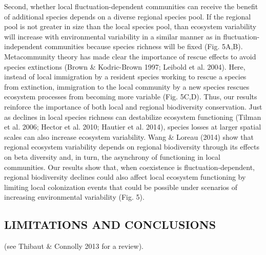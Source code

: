 \documentclass[12pt,]{article}
\begin{document}
Second, whether local fluctuation-dependent communities can receive the
benefit of additional species depends on a diverse regional species
pool. If the regional pool is not greater in size than the local species
pool, than ecosystem variability will increase with environmental
variability in a similar manner as in fluctuation-independent
communities because species richness will be fixed (Fig. 5A,B).
Metacommunity theory has made clear the importance of rescue effects to
avoid species extinctions (Brown \& Kodric-Brown 1997; Leibold et al.
2004). Here, instead of local immigration by a resident species working
to rescue a species from extinction, immigration to the local community
by a new species rescues ecosystem processes from becoming more variable
(Fig. 5C,D). Thus, our results reinforce the importance of both local
and regional biodiversity conservation. Just as declines in local
species richness can destabilize ecosystem functioning (Tilman et al.
2006; Hector et al. 2010; Hautier et al. 2014), species losses at larger
spatial scales can also increase ecosystem variability. Wang \& Loreau
(2014) show that regional ecosystem variability depends on regional
biodiversity through its effects on beta diversity and, in turn, the
asynchrony of functioning in local communities. Our results show that,
when coexistence is fluctuation-dependent, regional biodiversity
declines could also affect local ecosystem functioning by limiting local
colonization events that could be possible under scenarios of increasing
environmental variability (Fig. 5).

\subsection{LIMITATIONS AND
CONCLUSIONS}\label{limitations-and-conclusions}

(see Thibaut \& Connolly 2013 for a review).
\end{document}

